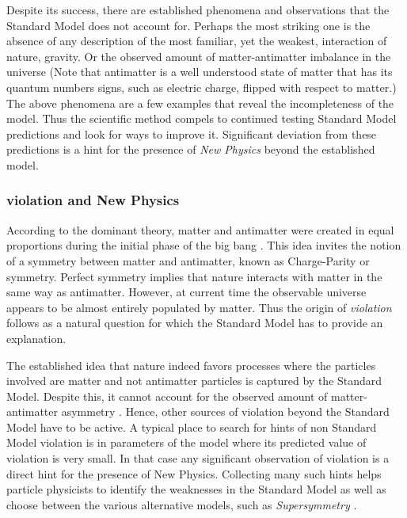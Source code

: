 Despite its success, there are established phenomena and observations that the Standard
Model does not account for. Perhaps the most striking one is the absence of any description
of the most familiar, yet the weakest, interaction of nature, gravity. Or the
observed amount of matter-antimatter imbalance in the universe \cite{more-cpv-huet,more-cpv-gavela_I,more-cpv-gavela_II}
(Note that antimatter is a well understood state of matter that has its quantum numbers signs,
such as electric charge, flipped with respect to matter.) The above phenomena are a few
examples that reveal the incompleteness of the model. Thus the scientific method compels
to continued testing Standard Model predictions and look for ways to improve it.
Significant deviation from these predictions is a hint for the presence of {\it New Physics}
beyond the established model.

\subsubsection{\CP violation and New Physics}
According to the dominant theory, matter and antimatter were created in equal proportions
during the initial phase of the big bang \cite{more-cpv-huet,more-cpv-gavela_I,more-cpv-gavela_II}.
This idea invites the notion of a symmetry between matter and antimatter, known as Charge-Parity
or \CP symmetry. Perfect \CP symmetry implies that nature interacts with matter in the same
way as antimatter. However, at current time the observable universe
appears to be almost entirely populated by matter. Thus the origin of {\it \CP  violation}
follows as a natural question for which the Standard Model has to provide an explanation.

The established idea that nature indeed favors processes where the particles involved
are matter and not antimatter particles is captured by the Standard Model.
Despite this, it cannot account for the observed amount of matter-antimatter asymmetry \cite{more-cpv-huet,more-cpv-gavela_I,more-cpv-gavela_II}.
Hence, other sources of \CP violation beyond the Standard Model have to be active.
A typical place to search for hints of non Standard Model \CP violation is in parameters
of the model where its predicted value of \CP violation is very small. In that case any
significant observation of \CP violation is a direct hint for the presence of New Physics.
Collecting many such hints helps particle physicists to identify the weaknesses in the
Standard Model as well as choose between the various alternative models, such as {\it Supersymmetry}
 \eg \cite{Golfand:1971iw,Volkov:1973ix,Wess:1974tw}.


